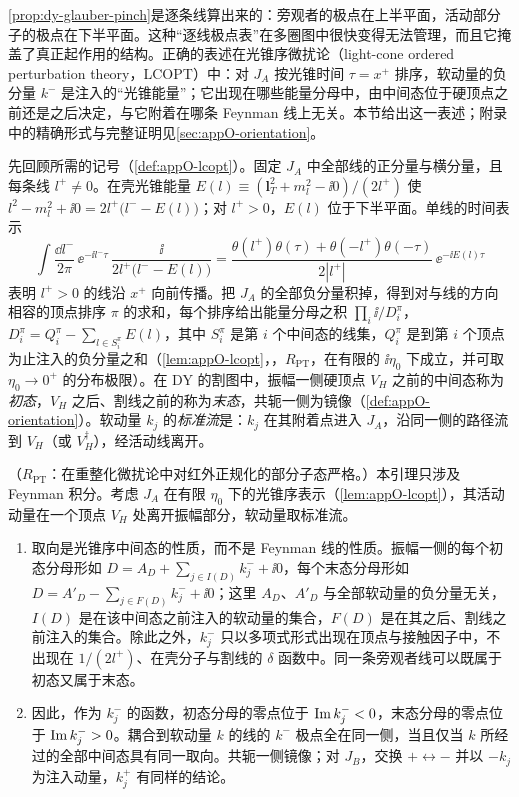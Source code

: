 \cref{prop:dy-glauber-pinch}是逐条线算出来的：旁观者的极点在上半平面，活动部分子的极点在下半平面。这种“逐线极点表”在多圈图中很快变得无法管理，而且它掩盖了真正起作用的结构。正确的表述在光锥序微扰论（light-cone ordered perturbation theory，LCOPT）中：对 $J_A$ 按光锥时间 $\tau=x^+$ 排序，软动量的负分量 $k^-$ 是注入的“光锥能量”；它出现在哪些能量分母中，由中间态位于硬顶点之前还是之后决定，与它附着在哪条 Feynman 线上无关。本节给出这一表述；附录中的精确形式与完整证明见\cref{sec:appO-orientation}。

先回顾所需的记号（\cref{def:appO-lcopt}）。固定 $J_A$ 中全部线的正分量与横分量，且每条线 $l^+\neq0$。在壳光锥能量 $E(l)\equiv(\mathbf l_T^2+m_l^2-\ii0)/(2l^+)$ 使 $l^2-m_l^2+\ii0=2l^+\big(l^--E(l)\big)$；对 $l^+>0$，$E(l)$ 位于下半平面。单线的时间表示
\begin{equation}\label{eq:dy-lc-fourier}
\int\frac{\dd l^-}{2\pi}\,\ee^{-\ii l^-\tau}\,\frac{\ii}{2l^+\big(l^--E(l)\big)}=\frac{\theta(l^+)\theta(\tau)+\theta(-l^+)\theta(-\tau)}{2|l^+|}\,\ee^{-\ii E(l)\tau}
\end{equation}
表明 $l^+>0$ 的线沿 $x^+$ 向前传播。把 $J_A$ 的全部负分量积掉，得到对与线的方向相容的顶点排序 $\pi$ 的求和，每个排序给出能量分母之积 $\prod_i\ii/D^\pi_i$，$D^\pi_i=Q^\pi_i-\sum_{l\in S^\pi_i}E(l)$，其中 $S^\pi_i$ 是第 $i$ 个中间态的线集，$Q^\pi_i$ 是到第 $i$ 个顶点为止注入的负分量之和（\cref{lem:appO-lcopt}，\tagR，$R_{\mathrm{PT}}$，在有限的 $\ii\eta_0$ 下成立，并可取 $\eta_0\to0^+$ 的分布极限）。在 DY 的割图中，振幅一侧硬顶点 $V_H$ 之前的中间态称为\emph{初态}，$V_H$ 之后、割线之前的称为\emph{末态}，共轭一侧为镜像（\cref{def:appO-orientation}）。软动量 $k_j$ 的\emph{标准流}是：$k_j$ 在其附着点进入 $J_A$，沿同一侧的路径流到 $V_H$（或 $V_H^\dagger$），经活动线离开。

\begin{lemma}\label{lem:dy-poles-orientation}
（$R_{\mathrm{PT}}$：在重整化微扰论中对红外正规化的部分子态严格。）本引理只涉及 Feynman 积分。考虑 $J_A$ 在有限 $\eta_0$ 下的光锥序表示（\cref{lem:appO-lcopt}），其活动动量在一个顶点 $V_H$ 处离开振幅部分，软动量取标准流。
\begin{enumerate}[label=(\alph*),leftmargin=2.2em,itemsep=1pt,topsep=2pt]
\item 取向是光锥序中间态的性质，而不是 Feynman 线的性质。振幅一侧的每个初态分母形如 $D=A_D+\sum_{j\in I(D)}k_j^-+\ii0$，每个末态分母形如 $D=A'_D-\sum_{j\in F(D)}k_j^-+\ii0$；这里 $A_D$、$A'_D$ 与全部软动量的负分量无关，$I(D)$ 是在该中间态之前注入的软动量的集合，$F(D)$ 是在其之后、割线之前注入的集合。除此之外，$k_j^-$ 只以多项式形式出现在顶点与接触因子中，不出现在 $1/(2l^+)$、在壳分子与割线的 $\delta$ 函数中。同一条旁观者线可以既属于初态又属于末态。
\item 因此，作为 $k_j^-$ 的函数，初态分母的零点位于 $\operatorname{Im} k_j^-<0$，末态分母的零点位于 $\operatorname{Im} k_j^->0$。耦合到软动量 $k$ 的线的 $k^-$ 极点全在同一侧，当且仅当 $k$ 所经过的全部中间态具有同一取向。共轭一侧镜像；对 $J_B$，交换 $+\leftrightarrow-$ 并以 $-k_j$ 为注入动量，$k_j^+$ 有同样的结论。
\end{enumerate}
\end{lemma}

